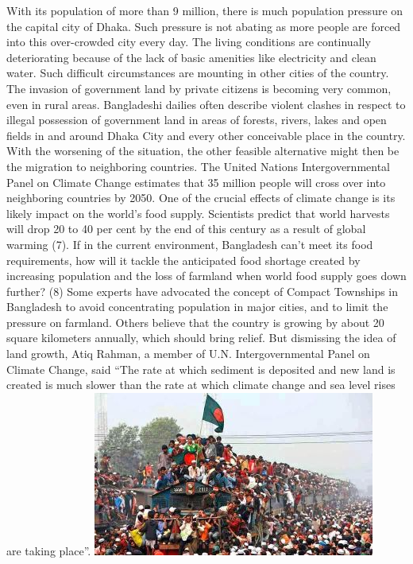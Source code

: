 \documentclass[a4paper,12pt]{article}
\begin{document}
With its population of more than 9 million, there is much population pressure on the capital city of Dhaka. Such pressure is not abating as more people are forced into this over-crowded city every day. The living conditions are continually deteriorating because of the lack of basic amenities like electricity and clean water. Such difficult circumstances are mounting in other cities of the country. The invasion of government land by private citizens is becoming very common, even in rural areas. Bangladeshi dailies often describe violent clashes in respect to illegal possession of government land in areas of forests, rivers, lakes and open fields in and around Dhaka City and every other conceivable place in the country. With the worsening of the situation, the other feasible alternative might then be the migration to neighboring countries. The United Nations Intergovernmental Panel on Climate Change estimates that 35 million people will cross over into neighboring countries by 2050.    One of the crucial effects of climate change is its likely impact on the world’s food supply. Scientists predict that world harvests will drop 20 to 40 per cent by the end of this century as a result of global warming (7). If in the current environment, Bangladesh can’t meet its food requirements, how will it tackle the anticipated food shortage created by increasing population and the loss of farmland when world food supply goes down further? (8)   Some experts have advocated the concept of Compact Townships in Bangladesh to avoid concentrating population in major cities, and to limit the pressure on farmland. Others believe that the country is growing by about 20 square kilometers annually, which should bring relief. But dismissing the idea of land growth, Atiq Rahman, a member of U.N. Intergovernmental Panel on Climate Change, said “The rate at which sediment is deposited and new land is created is much slower than the rate at which climate change and sea level rises are taking place”.  
\includegraphics[]{images/pb 1.jpg}
\end{document}
